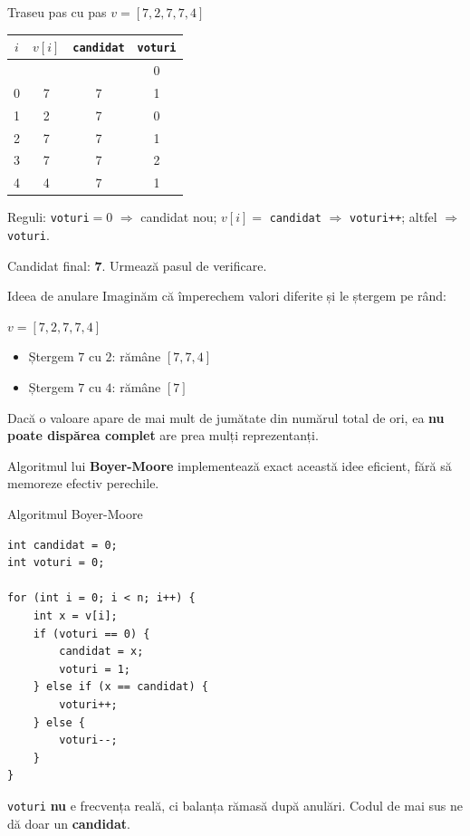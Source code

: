 ﻿\documentclass{beamer}
\begin{document}
\begin{frame}{Traseu pas cu pas \textemdash{} $v = [7, 2, 7, 7, 4]$}
  \begin{center}
  \begin{tabular}{cccc}
    \toprule
    $i$ & $v[i]$ & \texttt{candidat} & \texttt{voturi} \\
    \midrule
    \textemdash{} & \textemdash{} & \textemdash{} & 0 \\
    0 & 7 & 7 & 1 \\
    1 & 2 & 7 & 0 \\
    2 & 7 & 7 & 1 \\
    3 & 7 & 7 & 2 \\
    4 & 4 & 7 & 1 \\
    \bottomrule
  \end{tabular}
  \end{center}

  \smallskip
  Reguli: \texttt{voturi}$=0$ $\Rightarrow$ candidat nou; $v[i] =$ \texttt{candidat} $\Rightarrow$ \texttt{voturi++}; altfel $\Rightarrow$ \texttt{voturi\textendash{}\textendash{}}.

  \smallskip
  Candidat final: \textbf{7}. Urmează pasul de verificare.
\end{frame}

\begin{frame}{Ideea de anulare}
  Imaginăm că împerechem valori diferite și le ștergem pe rând:

  \smallskip
  $v = [7, 2, 7, 7, 4]$

  \begin{itemize}
    \item Ștergem $7$ cu $2$: rămâne $[7, 7, 4]$
    \item Ștergem $7$ cu $4$: rămâne $[7]$
  \end{itemize}

  \smallskip
  Dacă o valoare apare de mai mult de jumătate din numărul total de ori, ea \textbf{nu poate dispărea complet} \textemdash{} are prea mulți reprezentanți.

  \smallskip
  Algoritmul lui \textbf{Boyer-Moore} implementează exact această idee eficient, fără să memoreze efectiv perechile.
\end{frame}

\begin{frame}[fragile]{Algoritmul Boyer-Moore}
  \begin{lstlisting}
int candidat = 0;
int voturi = 0;

for (int i = 0; i < n; i++) {
    int x = v[i];
    if (voturi == 0) {
        candidat = x;
        voturi = 1;
    } else if (x == candidat) {
        voturi++;
    } else {
        voturi--;
    }
}
  \end{lstlisting}
  \lstinline|voturi| \textbf{nu} e frecvența reală, ci balanța rămasă după anulări. Codul de mai sus ne dă doar un \textbf{candidat}.
\end{frame}
\end{document}
